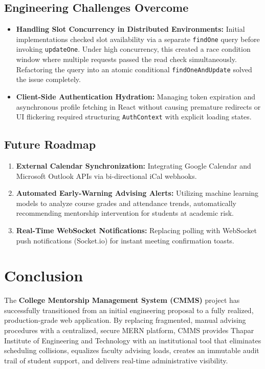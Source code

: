 \documentclass[11pt,a4paper]{article}
\begin{document}
\subsection{Engineering Challenges Overcome}
\begin{itemize}[leftmargin=1.4em, itemsep=0.2em]
  \item \textbf{Handling Slot Concurrency in Distributed Environments:} Initial implementations checked slot availability via a separate \texttt{findOne} query before invoking \texttt{updateOne}. Under high concurrency, this created a race condition window where multiple requests passed the read check simultaneously. Refactoring the query into an atomic conditional \texttt{findOneAndUpdate} solved the issue completely.
  \item \textbf{Client-Side Authentication Hydration:} Managing token expiration and asynchronous profile fetching in React without causing premature redirects or UI flickering required structuring \texttt{AuthContext} with explicit loading states.
\end{itemize}

\subsection{Future Roadmap}
\begin{enumerate}[leftmargin=1.4em, itemsep=0.2em]
  \item \textbf{External Calendar Synchronization:} Integrating Google Calendar and Microsoft Outlook APIs via bi-directional iCal webhooks.
  \item \textbf{Automated Early-Warning Advising Alerts:} Utilizing machine learning models to analyze course grades and attendance trends, automatically recommending mentorship intervention for students at academic risk.
  \item \textbf{Real-Time WebSocket Notifications:} Replacing polling with WebSocket push notifications (Socket.io) for instant meeting confirmation toasts.
\end{enumerate}

\section{Conclusion}
The \textbf{College Mentorship Management System (CMMS)} project has successfully transitioned from an initial engineering proposal to a fully realized, production-grade web application. By replacing fragmented, manual advising procedures with a centralized, secure MERN platform, CMMS provides Thapar Institute of Engineering and Technology with an institutional tool that eliminates scheduling collisions, equalizes faculty advising loads, creates an immutable audit trail of student support, and delivers real-time administrative visibility.
\end{document}
